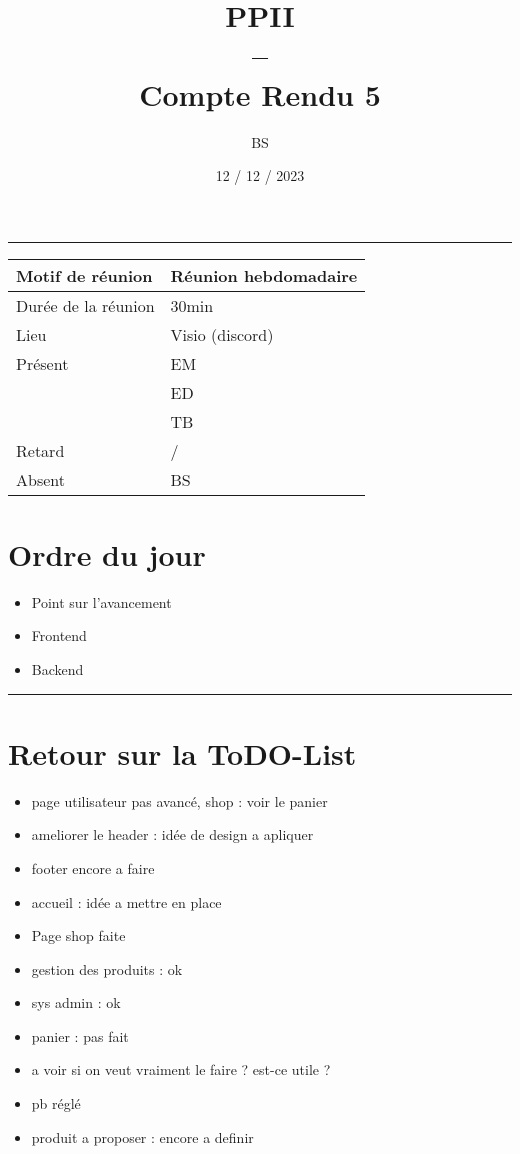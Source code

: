 \documentclass[10pt,a4paper]{report}
\title{PPII \\ -- \\ Compte Rendu 5}
\date{12 / 12 / 2023}
\author{BS}
\begin{document}
\maketitle

\tableofcontents \bigskip

\noindent\rule{\linewidth}{0.5mm} \bigskip

                \begin{tabular}{|l | l|}
                        \hline
                Motif de réunion & Réunion hebdomadaire \\
                        \hline
                Durée de la réunion & 30min \\
                        \hline
                Lieu & Visio (discord) \\
                        \hline
                Présent & EM \\
                        & ED \\
                        & TB  \\
                        \hline
                Retard  & / \\
                        \hline
                Absent  & BS \\
                        \hline
                \end{tabular}


\section{Ordre du jour}
\begin{itemize}
        \item Point sur l’avancement
        \item Frontend
        \item Backend
\end{itemize}

\noindent\rule{\linewidth}{0.5mm} \bigskip
\section{Retour sur la ToDO-List}
\begin{itemize}
        \item page utilisateur pas avancé, shop : voir le panier
        \item ameliorer le header : idée de design a apliquer
        \item footer encore a faire
        \item accueil : idée a mettre en place 
        \item Page shop faite
        \\
        \item gestion des produits : ok
        \item sys admin : ok
        \item panier : pas fait
        \item a voir si on veut vraiment le faire ? est-ce utile ?
        \item pb réglé
        \\
        \item produit a proposer : encore a definir  
\end{itemize}
\end{document}
